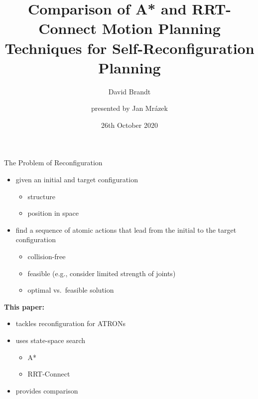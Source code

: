 \documentclass[ignorenonframetext,aspectratio=169,]{paradise-slide}
\title{Comparison of A* and RRT-Connect Motion Planning Techniques for
Self-Reconfiguration Planning}
\author{David Brandt \and \linebreak \and \linebreak \and presented by Jan Mrázek}
\date{26th October 2020}
\providecommand{\tightlist}{%
  \setlength{\itemsep}{0pt}\setlength{\parskip}{0pt}}
\begin{document}
\frame[plain]{\titlepage}

\begin{frame}[fragile]{The Problem of Reconfiguration}
\protect\hypertarget{the-problem-of-reconfiguration}{}

\begin{itemize}
\tightlist
\item
  given an initial and target configuration

  \begin{itemize}
  \tightlist
  \item
    structure
  \item
    position in space
  \end{itemize}
\item
  find a sequence of atomic actions that lead from the initial to the
  target configuration

  \begin{itemize}
  \tightlist
  \item
    collision-free
  \item
    feasible (e.g., consider limited strength of joints)
  \item
    optimal vs.~feasible solution
  \end{itemize}
\end{itemize}

\pause

\textbf{This paper:}

\begin{itemize}
\tightlist
\item
  tackles reconfiguration for ATRONs
\item
  uses state-space search

  \begin{itemize}
  \tightlist
  \item
    A*
  \item
    RRT-Connect
  \end{itemize}
\item
  provides comparison
\end{itemize}

\end{frame}
\end{document}

